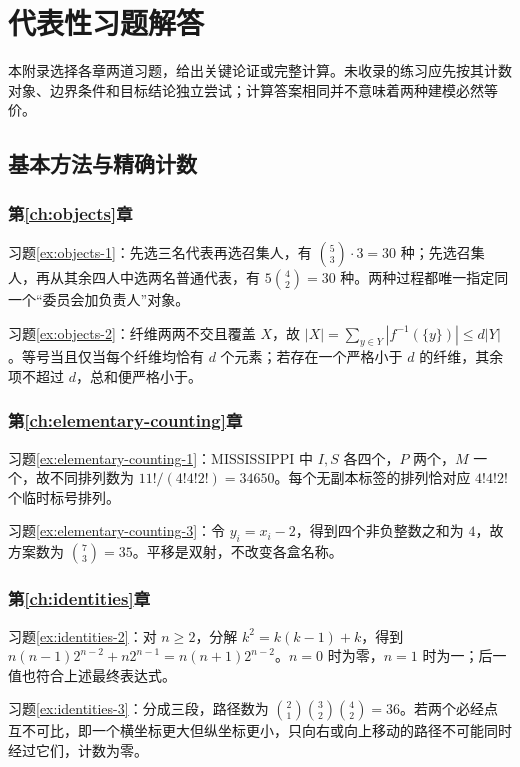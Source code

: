 \setcounter{chapter}{1} %
\chapter{代表性习题解答}
\label{app:exercises}

本附录选择各章两道习题，给出关键论证或完整计算。未收录的练习应先按其计数对象、边界条件和目标结论独立尝试；计算答案相同并不意味着两种建模必然等价。

\section{基本方法与精确计数}

\subsection{第\ref{ch:objects}章}

习题\ref{ex:objects-1}：先选三名代表再选召集人，有 $\binom53\cdot3=30$ 种；先选召集人，再从其余四人中选两名普通代表，有 $5\binom42=30$ 种。两种过程都唯一指定同一个“委员会加负责人”对象。

习题\ref{ex:objects-2}：纤维两两不交且覆盖 $X$，故 $|X|=\sum_{y\in Y}|f^{-1}(\{y\})|\le d|Y|$。等号当且仅当每个纤维均恰有 $d$ 个元素；若存在一个严格小于 $d$ 的纤维，其余项不超过 $d$，总和便严格小于。

\subsection{第\ref{ch:elementary-counting}章}

习题\ref{ex:elementary-counting-1}：$\mathrm{MISSISSIPPI}$ 中 $I,S$ 各四个，$P$ 两个，$M$ 一个，故不同排列数为 $11!/(4!4!2!)=34650$。每个无副本标签的排列恰对应 $4!4!2!$ 个临时标号排列。

习题\ref{ex:elementary-counting-3}：令 $y_i=x_i-2$，得到四个非负整数之和为 $4$，故方案数为 $\binom73=35$。平移是双射，不改变各盒名称。

\subsection{第\ref{ch:identities}章}

习题\ref{ex:identities-2}：对 $n\ge2$，分解 $k^2=k(k-1)+k$，得到 $n(n-1)2^{n-2}+n2^{n-1}=n(n+1)2^{n-2}$。$n=0$ 时为零，$n=1$ 时为一；后一值也符合上述最终表达式。

习题\ref{ex:identities-3}：分成三段，路径数为 $\binom21\binom32\binom42=36$。若两个必经点互不可比，即一个横坐标更大但纵坐标更小，只向右或向上移动的路径不可能同时经过它们，计数为零。

